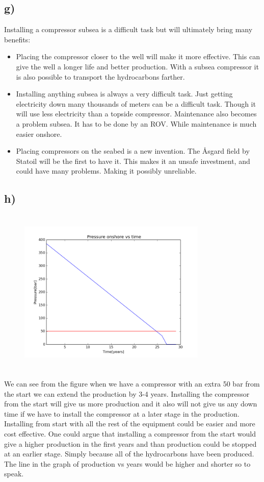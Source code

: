\documentclass[DIV=calc, paper=a4, fontsize=13pt, twocolumn]{scrartcl}	 %
\begin{document}
\subsection*{g)}
Installing a compressor subsea is a difficult task but will ultimately bring many benefits:
\begin{itemize}
\item Placing the compressor closer to the well will make it more effective. This can give the well a longer life and better production. With a subsea compressor it is also possible to transport the hydrocarbons farther.
\item Installing anything subsea is always a very difficult task. Just getting electricity down many thousands of meters can be a difficult task. Though it will use less electricity than a topside compressor. Maintenance also becomes a problem subsea. It has to be done by an ROV. While maintenance is much easier onshore.
\item Placing compressors on the seabed is a new invention. The Åsgard field by Statoil will be the first to have it. This makes it an unsafe investment, and could have many problems. Making it possibly unreliable.
\end{itemize}


\subsection*{h)}
\begin{figure}[h]
\includegraphics[width=9cm,height=8cm]{Pressure_compressor.png}
\end{figure}
We can see from the figure when we have a compressor with an extra 50 bar from the start we can extend the production by 3-4 years. Installing the compressor from the start will give us more production and it also will not give us any down time if we have to install the compressor at a later stage in the production. Installing from start with all the rest of the equipment could be easier and more cost effective.
\newline
One could argue that installing a compressor from the start would give a higher production in the first years and than production could be stopped at an earlier stage. Simply because all of the hydrocarbons have been produced. The line in the graph of production vs years would be higher and shorter so to speak.
\end{document}
